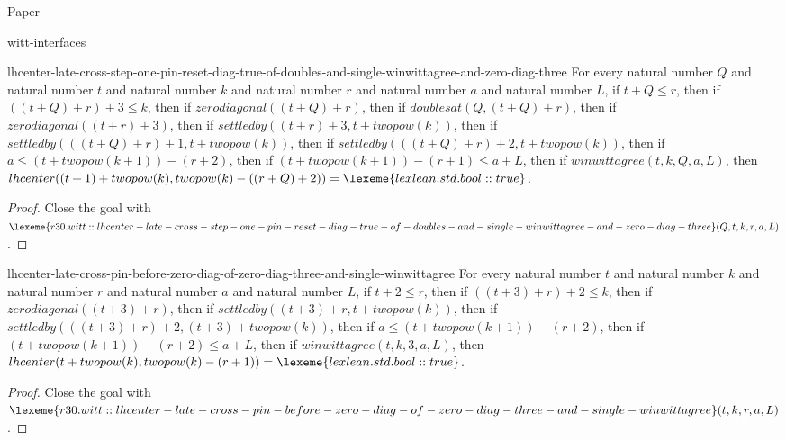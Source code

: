 \begin{lexlean}{Paper}
\begin{section}{witt-interfaces}
  \begin{theorem}{lhcenter-late-cross-step-one-pin-reset-diag-true-of-doubles-and-single-winwittagree-and-zero-diag-three}
  For every natural number \(Q\) and natural number \(t\) and natural number \(k\) and natural number \(r\) and natural number \(a\) and natural number \(L\), if \(t + Q ≤ r\), then if \(((t + Q) + r) + 3 ≤ k\), then if \(zerodiagonal((t + Q) + r)\), then if \(doublesat(Q, (t + Q) + r)\), then if \(zerodiagonal((t + r) + 3)\), then if \(settledby((t + r) + 3, t + twopow(k))\), then if \(settledby(((t + Q) + r) + 1, t + twopow(k))\), then if \(settledby(((t + Q) + r) + 2, t + twopow(k))\), then if \(a ≤ (t + twopow(k + 1)) - (r + 2)\), then if \((t + twopow(k + 1)) - (r + 1) ≤ a + L\), then if \(winwittagree(t, k, Q, a, L)\), then \(lhcenter((t + 1) + twopow(k), twopow(k) - ((r + Q) + 2)) = \lexeme{lexlean.std.bool::true}\).
  \begin{proof}
  Close the goal with \(\lexeme{r30.witt::lhcenter-late-cross-step-one-pin-reset-diag-true-of-doubles-and-single-winwittagree-and-zero-diag-three}(Q, t, k, r, a, L)\).
  \end{proof}
  \end{theorem}

  \begin{theorem}{lhcenter-late-cross-pin-before-zero-diag-of-zero-diag-three-and-single-winwittagree}
  For every natural number \(t\) and natural number \(k\) and natural number \(r\) and natural number \(a\) and natural number \(L\), if \(t + 2 ≤ r\), then if \(((t + 3) + r) + 2 ≤ k\), then if \(zerodiagonal((t + 3) + r)\), then if \(settledby((t + 3) + r, t + twopow(k))\), then if \(settledby(((t + 3) + r) + 2, (t + 3) + twopow(k))\), then if \(a ≤ (t + twopow(k + 1)) - (r + 2)\), then if \((t + twopow(k + 1)) - (r + 2) ≤ a + L\), then if \(winwittagree(t, k, 3, a, L)\), then \(lhcenter(t + twopow(k), twopow(k) - (r + 1)) = \lexeme{lexlean.std.bool::true}\).
  \begin{proof}
  Close the goal with \(\lexeme{r30.witt::lhcenter-late-cross-pin-before-zero-diag-of-zero-diag-three-and-single-winwittagree}(t, k, r, a, L)\).
  \end{proof}
  \end{theorem}


\end{section}
\end{lexlean}
